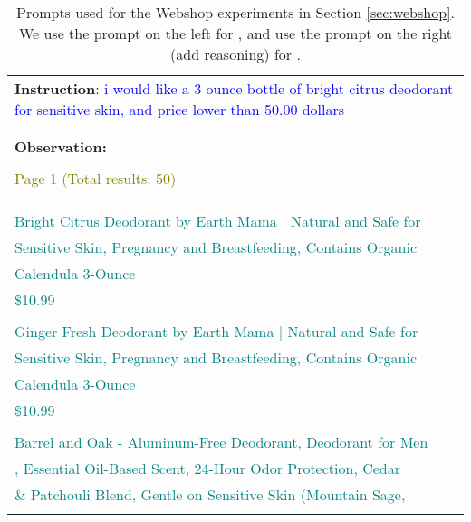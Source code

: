 \begin{table}[H]

\scriptsize
\renewcommand\cellalign{lt}
\setcellgapes{3pt}\makegapedcells
\caption{Prompts used for the Webshop experiments in Section \ref{sec:webshop}. We use the prompt on the left for \act{}, and use the prompt on the right (add reasoning) for \model{}.}
\label{prompts:webshop}
\begin{tabular}{l|l} \toprule
\multicolumn{2}{l}{
\textbf{Instruction}: \textcolor{blue}{i would like a 3 ounce bottle of bright citrus deodorant for sensitive skin, and price lower than 50.00 dollars } 
}\\
\multicolumn{1}{c}{\act{}} & \multicolumn{1}{c}{\model{}} \\
\makecell{    
\textbf{Action}: \textbf{search}\big[\textcolor{violet}{3 ounce bright citrus deodorant sensitive skin}\big] \\
\textbf{Observation:} \\
\textcolor{red}{} \\
\textcolor{olive} {Page 1 (Total results: 50)} \\
\textcolor{red}{} \\
\\
\textcolor{purple}{} \\
\textcolor{teal}{Bright Citrus Deodorant by Earth Mama | Natural and Safe for }\\
\textcolor{teal}{  Sensitive Skin, Pregnancy and Breastfeeding, Contains Organic }\\
\textcolor{teal}{  Calendula 3-Ounce }\\
\textcolor{teal}{\$10.99}\\
\textcolor{purple}{} \\
\textcolor{teal}{Ginger Fresh Deodorant by Earth Mama | Natural and Safe for }\\
\textcolor{teal}{  Sensitive Skin, Pregnancy and Breastfeeding, Contains Organic }\\
\textcolor{teal}{  Calendula 3-Ounce }\\
\textcolor{teal}{\$10.99 }\\
\textcolor{purple}{} \\
\textcolor{teal}{Barrel and Oak - Aluminum-Free Deodorant, Deodorant for Men}\\
\textcolor{teal}{, Essential Oil-Based Scent, 24-Hour Odor Protection, Cedar}\\
\textcolor{teal}{\& Patchouli Blend, Gentle on Sensitive Skin (Mountain Sage,}\\
}
\end{tabular}
\end{table}
